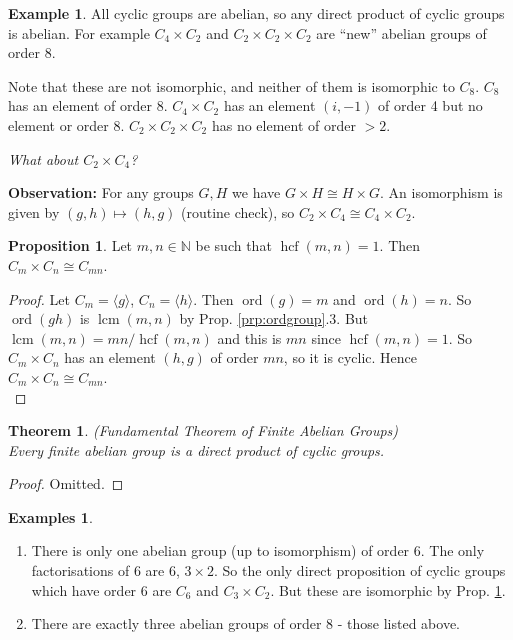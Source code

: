 \documentclass{article}
\newtheorem{theorem}{Theorem}[section]
\theoremstyle{definition}
\newtheorem{proposition}{Proposition}
\newtheorem*{exmp}{Example}
\newtheorem*{exmps}{Examples}
\newcommand{\gene}[1]{\langle #1 \rangle}
\newcommand{\naturals}{\mathbb{N}}
\newcommand{\ism}{\cong}
\DeclareMathOperator{\lcm}{lcm}
\DeclareMathOperator{\hcf}{hcf}
\DeclareMathOperator{\ord}{\text{ord}}
\begin{document}
\begin{exmp}
  All cyclic groups are abelian, so any direct product of cyclic groups is abelian. For example $C_4 \times C_2$ and $C_2 \times C_2 \times C_2$ are ``new'' abelian groups of order 8.

  Note that these are not isomorphic, and neither of them is isomorphic to $C_8$. $C_8$ has an element of order 8. $C_4 \times C_2$ has an element $(i,-1)$ of order 4 but no element or order 8.  $C_2 \times C_2 \times C_2$ has no element of order $> 2$.

\end{exmp}
  \emph{What about $C_2 \times C_4$?}

  \textbf{Observation:} For any groups $G,H$ we have $G \times H \ism H \times G$. An isomorphism is given by $(g,h)\mapsto (h,g)$ (routine check), so $C_2 \times C_4 \ism C_4 \times C_2$.\\

  \begin{proposition}
  \label{prp:hcfcyclic}
    Let $m,n \in \naturals$ be such that $\hcf(m,n)=1$. Then $C_m \times C_n \ism C_{mn}$.
  \end{proposition}

  \begin{proof}
    Let $C_m = \gene{g}$, $C_n=\gene{h}$. Then $\ord(g)=m$ and $\ord(h)=n$. So $\ord(gh)$ is $\lcm(m,n)$ by Prop. \ref{prp:ordgroup}.3. But $\lcm(m,n)=mn/\hcf(m,n)$ and this is $mn$ since $\hcf(m,n)=1$. So $C_m \times C_n$ has an element $(h,g)$ of order $mn$, so it is cyclic. Hence $C_m \times C_n \ism C_{mn}$.\\
  \end{proof} 

  \begin{theorem}(Fundamental Theorem of Finite Abelian Groups)\hfill\\
    Every finite abelian group is a direct product of cyclic groups.
    \label{thm:funda}
  \end{theorem}

  \begin{proof}
    Omitted.
  \end{proof}

  \begin{exmps}\hfill
    \begin{enumerate}
      \item There is only one abelian group (up to isomorphism) of order 6. The only factorisations of 6 are 6, $3 \times 2$. So the only direct proposition of cyclic groups which have order 6 are $C_6$ and $C_3 \times C_2$. But these are isomorphic by Prop. \ref{prp:hcfcyclic}.
      \item There are exactly three abelian groups of order 8 - those listed above.
    \end{enumerate}
  \end{exmps}
\end{document}

